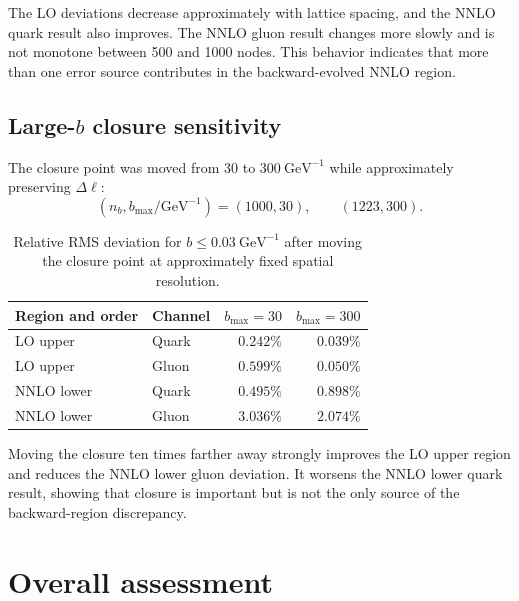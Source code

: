\documentclass[11pt]{article}
\begin{document}
The LO deviations decrease approximately with lattice spacing, and the NNLO
quark result also improves. The NNLO gluon result changes more slowly and is
not monotone between 500 and 1000 nodes. This behavior indicates that more
than one error source contributes in the backward-evolved NNLO region.

\subsection{\texorpdfstring{Large-\(b\)}{Large-b} closure sensitivity}

The closure point was moved from \(30\) to \(300~\mathrm{GeV}^{-1}\) while
approximately preserving \(\Delta\ell\):
\[
  (n_b,b_{\max}/\mathrm{GeV}^{-1})=(1000,30),\qquad(1223,300).
\]

\begin{table}[H]
\centering
\caption{Relative RMS deviation for \(b\le0.03~\mathrm{GeV}^{-1}\) after
moving the closure point at approximately fixed spatial resolution.}
\label{tab:closure-comparison}
\begin{tabular}{llrr}
\toprule
Region and order & Channel & \(b_{\max}=30\) & \(b_{\max}=300\)\\
\midrule
LO upper & Quark & \(0.242\%\) & \(0.039\%\)\\
LO upper & Gluon & \(0.599\%\) & \(0.050\%\)\\
NNLO lower & Quark & \(0.495\%\) & \(0.898\%\)\\
NNLO lower & Gluon & \(3.036\%\) & \(2.074\%\)\\
\bottomrule
\end{tabular}
\end{table}

Moving the closure ten times farther away strongly improves the LO upper
region and reduces the NNLO lower gluon deviation. It worsens the NNLO lower
quark result, showing that closure is important but is not the only source of
the backward-region discrepancy.

\section{Overall assessment}
\end{document}
